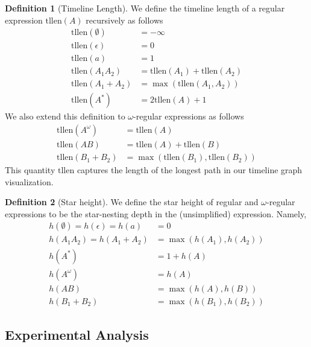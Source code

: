\documentclass[preprint,12pt]{elsarticle}
\theoremstyle{definition}
\newtheorem{definition}{Definition}[section]
\theoremstyle{remark}
\newcommand{\tllen}{\text{tllen}}
\begin{document}
\begin{definition}[Timeline Length]
    We define the timeline length of a regular expression $\tllen(A)$ recursively as follows
    \begin{align*}
        \tllen(\emptyset)   &= -\infty\\
        \tllen(\epsilon)        &= 0\\
        \tllen(a)           &= 1\\
        \tllen(A_1 A_2)     &= \tllen(A_1) + \tllen(A_2)\\
        \tllen(A_1 + A_2)   &= \max(\tllen(A_1, A_2))\\
        \tllen(A^*)         &= 2\tllen(A) + 1
    \end{align*}
    We also extend this definition to $\omega$-regular expressions as follows
    \begin{align*}
        \tllen(A^\omega)    &= \tllen(A)\\
        \tllen(AB)          &= \tllen(A) + \tllen(B)\\
        \tllen(B_1 + B_2)   &= \max(\tllen(B_1), \tllen(B_2))
    \end{align*}
    This quantity $\tllen$ captures the length of the longest path in our timeline graph visualization.
\end{definition}

\begin{definition}[Star height]
    We define the star height of regular and $\omega$-regular expressions to be the star-nesting depth in the (unsimplified) expression. Namely,
    \begin{align*}
        h(\emptyset) = h(\epsilon) = h(a) &= 0\\
        h(A_1 A_2) = h(A_1 + A_2) &= \max(h(A_1), h(A_2))\\
        h(A^*) &= 1 + h(A)\\
        h(A^\omega) &= h(A)\\
        h(A B) &= \max(h(A), h(B))\\
        h(B_1 + B_2) &= \max(h(B_1), h(B_2))
    \end{align*}

\end{definition}

\subsection{Experimental Analysis} %
\end{document}
